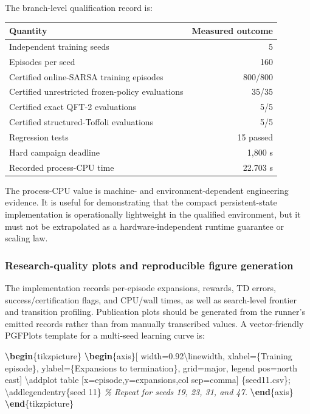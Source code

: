 \documentclass[
]{article}
\newenvironment{Shaded}{}{}
\newcommand{\CommentTok}[1]{\textcolor[rgb]{0.38,0.63,0.69}{\textit{#1}}}
\newcommand{\ExtensionTok}[1]{#1}
\newcommand{\FunctionTok}[1]{\textcolor[rgb]{0.02,0.16,0.49}{#1}}
\newcommand{\KeywordTok}[1]{\textcolor[rgb]{0.00,0.44,0.13}{\textbf{#1}}}
\newcommand{\NormalTok}[1]{#1}
\begin{document}
The branch-level qualification record is:

\begin{longtable}[]{@{}lr@{}}
\toprule\noalign{}
Quantity & Measured outcome \\
\midrule\noalign{}
\endhead
\bottomrule\noalign{}
\endlastfoot
Independent training seeds & 5 \\
Episodes per seed & 160 \\
Certified online-SARSA training episodes & 800/800 \\
Certified unrestricted frozen-policy evaluations & 35/35 \\
Certified exact QFT-2 evaluations & 5/5 \\
Certified structured-Toffoli evaluations & 5/5 \\
Regression tests & 15 passed \\
Hard campaign deadline & 1,800 s \\
Recorded process-CPU time & 22.703 s \\
\end{longtable}

The process-CPU value is machine- and environment-dependent engineering
evidence. It is useful for demonstrating that the compact
persistent-state implementation is operationally lightweight in the
qualified environment, but it must not be extrapolated as a
hardware-independent runtime guarantee or scaling law.

\hypertarget{research-quality-plots-and-reproducible-figure-generation}{%
\subsubsection{Research-quality plots and reproducible figure
generation}\label{research-quality-plots-and-reproducible-figure-generation}}

The implementation records per-episode expansions, rewards, TD errors,
success/certification flags, and CPU/wall times, as well as search-level
frontier and transition profiling. Publication plots should be generated
from the runner's emitted records rather than from manually transcribed
values. A vector-friendly PGFPlots template for a multi-seed learning
curve is:

\begin{Shaded}
\begin{Highlighting}[]
\KeywordTok{\textbackslash{}begin}\NormalTok{\{}\ExtensionTok{tikzpicture}\NormalTok{\}}
\KeywordTok{\textbackslash{}begin}\NormalTok{\{}\ExtensionTok{axis}\NormalTok{\}[}
\NormalTok{  width=0.92}\FunctionTok{\textbackslash{}linewidth}\NormalTok{,}
\NormalTok{  xlabel=\{Training episode\},}
\NormalTok{  ylabel=\{Expansions to termination\},}
\NormalTok{  grid=major,}
\NormalTok{  legend pos=north east]}
\FunctionTok{\textbackslash{}addplot}\NormalTok{ table [x=episode,y=expansions,col sep=comma] \{seed11.csv\};}
\FunctionTok{\textbackslash{}addlegendentry}\NormalTok{\{seed 11\}}
\CommentTok{\% Repeat for seeds 19, 23, 31, and 47.}
\KeywordTok{\textbackslash{}end}\NormalTok{\{}\ExtensionTok{axis}\NormalTok{\}}
\KeywordTok{\textbackslash{}end}\NormalTok{\{}\ExtensionTok{tikzpicture}\NormalTok{\}}
\end{Highlighting}
\end{Shaded}
\end{document}
